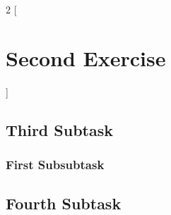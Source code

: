 \documentclass[a4paper]{article} %
\begin{document}
\bigskip


\begin{multicols}{2}
[
\section{Second Exercise}
\blindtext
]

\subsection{Third Subtask}
\Blindtext

\subsubsection{First Subsubtask}
\blindtext\cite{Bird2014}

\subsection{Fourth Subtask}
\blindtext

\end{multicols}

\bigskip


\printbibliography

\end{document}
